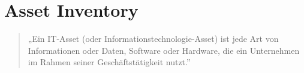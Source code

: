 \section{Asset Inventory}

\begin{quote} 
  „Ein IT-Asset (oder Informationstechnologie-Asset) ist jede Art von Informationen oder Daten, Software oder Hardware, die ein Unternehmen im Rahmen seiner Geschäftstätigkeit nutzt.'' 
\end{quote}

